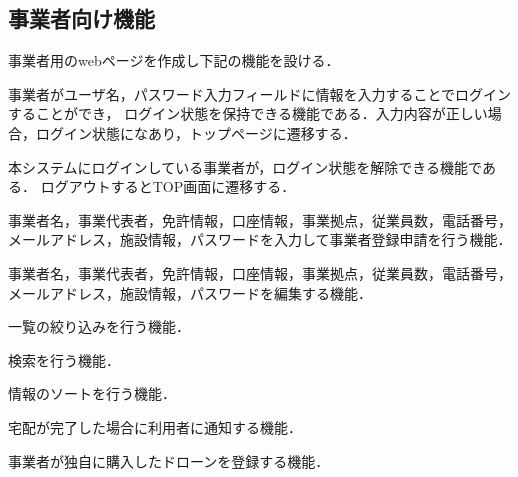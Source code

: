 \documentclass[a4paper, titlepage]{jsarticle}
\begin{document}
\subsection{事業者向け機能}
事業者用のwebページを作成し下記の機能を設ける．
\begin{description}[labelwidth=\linewidth]
  \setlength{\leftskip}{1em}

  \item [ログイン機能]  事業者がユーザ名，パスワード入力フィールドに情報を入力することでログインすることができ，
  ログイン状態を保持できる機能である．入力内容が正しい場合，ログイン状態になあり，トップページに遷移する．
  \item [ログアウト機能]  本システムにログインしている事業者が，ログイン状態を解除できる機能である．
  ログアウトするとTOP画面に遷移する．
  \item [事業者登録申請機能]  事業者名，事業代表者，免許情報，口座情報，事業拠点，従業員数，電話番号，メールアドレス，施設情報，パスワードを入力して事業者登録申請を行う機能．
  \item [事業者情報編集機能]  事業者名，事業代表者，免許情報，口座情報，事業拠点，従業員数，電話番号，メールアドレス，施設情報，パスワードを編集する機能．



  \item [絞り込み機能] 一覧の絞り込みを行う機能．
  \item [検索機能] 検索を行う機能．
  \item [情報ソート機能] 情報のソートを行う機能．
  \item [配達完了通知機能]  宅配が完了した場合に利用者に通知する機能．
  \item [使用ドローン登録機能]  事業者が独自に購入したドローンを登録する機能．


\end{description}
\end{document}
